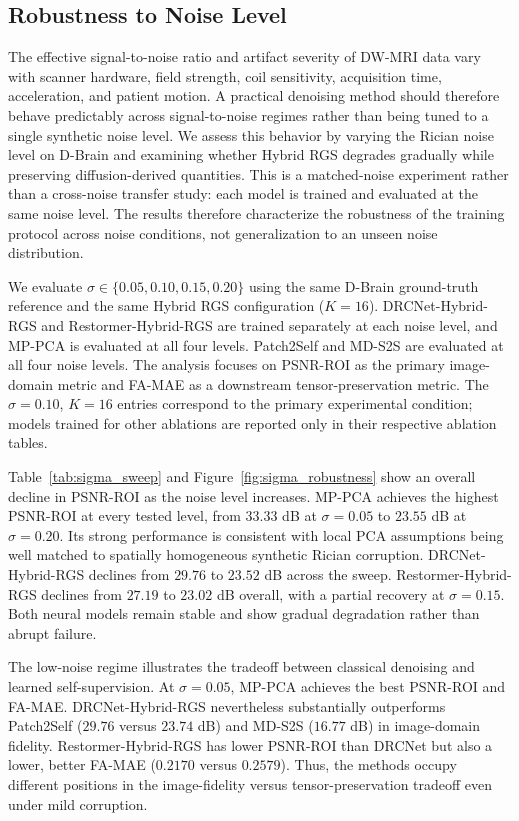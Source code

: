\documentclass[preprint,12pt]{elsarticle}
\begin{document}
\subsection{Robustness to Noise Level}
The effective signal-to-noise ratio and artifact severity of DW-MRI data vary with scanner hardware, field strength, coil sensitivity, acquisition time, acceleration, and patient motion. A practical denoising method should therefore behave predictably across signal-to-noise regimes rather than being tuned to a single synthetic noise level. We assess this behavior by varying the Rician noise level on D-Brain and examining whether Hybrid RGS degrades gradually while preserving diffusion-derived quantities. This is a matched-noise experiment rather than a cross-noise transfer study: each model is trained and evaluated at the same noise level. The results therefore characterize the robustness of the training protocol across noise conditions, not generalization to an unseen noise distribution.

We evaluate $\sigma \in \{0.05,0.10,0.15,0.20\}$ using the same D-Brain ground-truth reference and the same Hybrid RGS configuration ($K=16$). DRCNet-Hybrid-RGS and Restormer-Hybrid-RGS are trained separately at each noise level, and MP-PCA is evaluated at all four levels. Patch2Self and MD-S2S are evaluated at all four noise levels. The analysis focuses on PSNR-ROI as the primary image-domain metric and FA-MAE as a downstream tensor-preservation metric. The $\sigma=0.10$, $K=16$ entries correspond to the primary experimental condition; models trained for other ablations are reported only in their respective ablation tables.

Table~\ref{tab:sigma_sweep} and Figure~\ref{fig:sigma_robustness} show an overall decline in PSNR-ROI as the noise level increases. MP-PCA achieves the highest PSNR-ROI at every tested level, from $33.33$ dB at $\sigma=0.05$ to $23.55$ dB at $\sigma=0.20$. Its strong performance is consistent with local PCA assumptions being well matched to spatially homogeneous synthetic Rician corruption. DRCNet-Hybrid-RGS declines from $29.76$ to $23.52$ dB across the sweep. Restormer-Hybrid-RGS declines from $27.19$ to $23.02$ dB overall, with a partial recovery at $\sigma=0.15$. Both neural models remain stable and show gradual degradation rather than abrupt failure.

The low-noise regime illustrates the tradeoff between classical denoising and learned self-supervision. At $\sigma=0.05$, MP-PCA achieves the best PSNR-ROI and FA-MAE. DRCNet-Hybrid-RGS nevertheless substantially outperforms Patch2Self ($29.76$ versus $23.74$ dB) and MD-S2S ($16.77$ dB) in image-domain fidelity. Restormer-Hybrid-RGS has lower PSNR-ROI than DRCNet but also a lower, better FA-MAE ($0.2170$ versus $0.2579$). Thus, the methods occupy different positions in the image-fidelity versus tensor-preservation tradeoff even under mild corruption.
\end{document}
